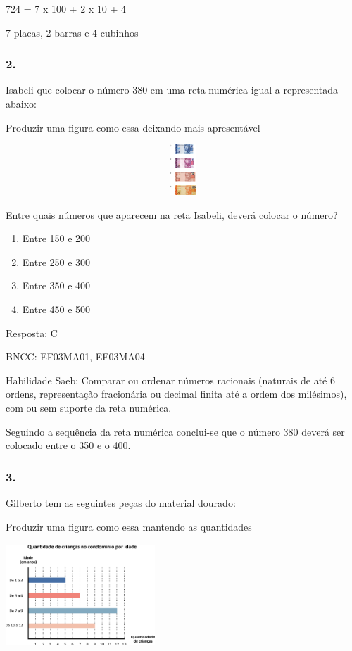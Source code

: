 724 = 7 x 100 + 2 x 10 + 4

7 placas, 2 barras e 4 cubinhos

\subsubsection{2.}\label{section-142}

Isabeli que colocar o número 380 em uma reta numérica igual a
representada abaixo:

Produzir uma figura como essa deixando mais apresentável

\includegraphics[width=5.90556in,height=0.74931in]{media/image117.png}

Entre quais números que aparecem na reta Isabeli, deverá colocar o
número?

\begin{enumerate}
\def\labelenumi{\alph{enumi})}
\item
  Entre 150 e 200
\item
  Entre 250 e 300
\item
  Entre 350 e 400
\item
  Entre 450 e 500
\end{enumerate}

Resposta: C

BNCC: EF03MA01, EF03MA04

Habilidade Saeb: Comparar ou ordenar números racionais (naturais de até
6 ordens, representação fracionária ou decimal finita até a ordem dos
milésimos), com ou sem suporte da reta numérica.

Seguindo a sequência da reta numérica conclui-se que o número 380 deverá
ser colocado entre o 350 e o 400.

\subsubsection{3.}\label{section-143}

Gilberto tem as seguintes peças do material dourado:

Produzir uma figura como essa mantendo as quantidades

\includegraphics[width=2.20852in,height=1.52513in]{media/image118.png}

